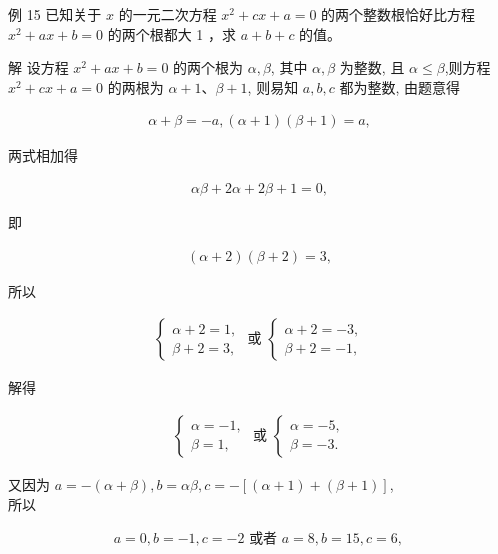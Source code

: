 \documentclass[10pt]{article}
\begin{document}
例 15 已知关于 $x$ 的一元二次方程 $x^{2}+c x+a=0$ 的两个整数根恰好比方程 $x^{2}+a x+b=0$ 的两个根都大 1 ，求 $a+b+c$ 的值。

解 设方程 $x^{2}+a x+b=0$ 的两个根为 $\alpha, \beta$, 其中 $\alpha, \beta$ 为整数, 且 $\alpha \leqslant \beta$,则方程 $x^{2}+c x+a=0$ 的两根为 $\alpha+1 、 \beta+1$, 则易知 $a, b, c$ 都为整数, 由题意得

\begin{align*}
\alpha+\beta=-a,(\alpha+1)(\beta+1)=a,
\end{align*}

两式相加得

\begin{align*}
\alpha \beta+2 \alpha+2 \beta+1=0,
\end{align*}

即

\begin{align*}
(\alpha+2)(\beta+2)=3,
\end{align*}

所以

\begin{align*}
\left\{\begin{array} { l } 
{ \alpha + 2 = 1 , } \\
{ \beta + 2 = 3 , }
\end{array} \text { 或 } \left\{\begin{array}{l}
\alpha+2=-3, \\
\beta+2=-1,
\end{array}\right.\right.
\end{align*}

解得

\begin{align*}
\left\{\begin{array} { l } 
{ \alpha = - 1 , } \\
{ \beta = 1 , }
\end{array} \text { 或 } \left\{\begin{array}{l}
\alpha=-5, \\
\beta=-3 .
\end{array}\right.\right.
\end{align*}

又因为 $a=-(\alpha+\beta), b=\alpha \beta, c=-[(\alpha+1)+(\beta+1)]$,\\
所以

\begin{align*}
a=0, b=-1, c=-2 \text { 或者 } a=8, b=15, c=6 \text {, }
\end{align*}
\end{document}
